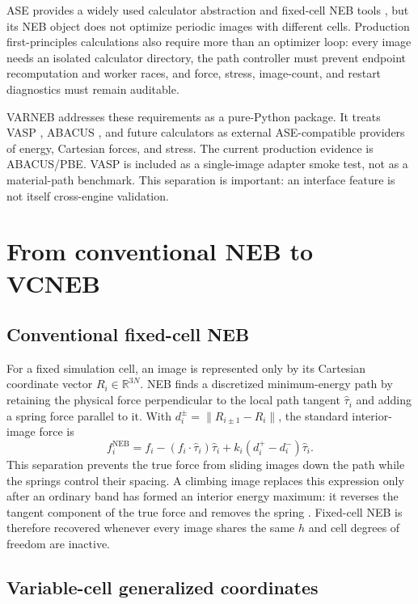 \documentclass[final,3p,times]{elsarticle}
\begin{document}
ASE provides a widely used calculator abstraction and fixed-cell NEB tools
\cite{Larsen2017}, but its NEB object does not optimize periodic images with
different cells. Production first-principles calculations also require more
than an optimizer loop: every image needs an isolated calculator directory,
the path controller must prevent endpoint recomputation and worker races, and
force, stress, image-count, and restart diagnostics must remain auditable.

VARNEB addresses these requirements as a pure-Python package. It treats VASP
\cite{Kresse1996a,Kresse1996b}, ABACUS \cite{Li2016}, and future calculators as
external ASE-compatible providers of energy, Cartesian forces, and stress.
The current production evidence is ABACUS/PBE. VASP is included as a
single-image adapter smoke test, not as a material-path benchmark. This
separation is important: an interface feature is not itself cross-engine
validation.

\section{From conventional NEB to VCNEB}
\label{sec:method}

\subsection{Conventional fixed-cell NEB}

For a fixed simulation cell, an image is represented only by its Cartesian
coordinate vector $R_i\in\mathbb{R}^{3N}$.  NEB finds a discretized
minimum-energy path by retaining the physical force perpendicular to the local
path tangent $\hat\tau_i$ and adding a spring force parallel to it.  With
$d_i^{\pm}=\lVert R_{i\pm1}-R_i\rVert$, the standard interior-image force is
\begin{equation}
 f_i^{\mathrm{NEB}}=
 f_i-(f_i\cdot\hat\tau_i)\hat\tau_i+
 k_i(d_i^+-d_i^-)\hat\tau_i .
 \label{eq:fixed-neb}
\end{equation}
This separation prevents the true force from sliding images down the path while
the springs control their spacing.  A climbing image replaces this expression
only after an ordinary band has formed an interior energy maximum: it reverses
the tangent component of the true force and removes the spring
\cite{Henkelman2000}.  Fixed-cell NEB is therefore recovered whenever every
image shares the same $h$ and cell degrees of freedom are inactive.

\subsection{Variable-cell generalized coordinates}
\end{document}
